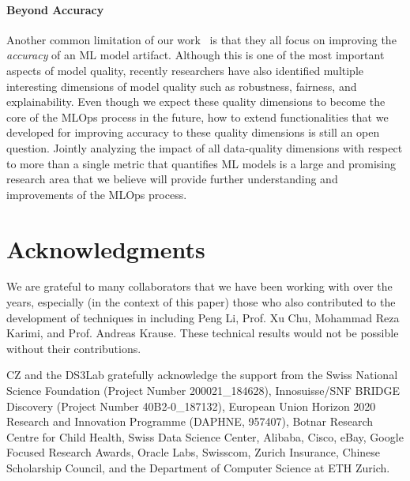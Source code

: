 \documentclass[11pt]{article}
\begin{document}
\paragraph{Beyond Accuracy}
Another common limitation of our work~\cite{karlavs2020nearest, renggli2020automatic, karimi2020online, renggli2019continuous}
is that they all focus on improving the \textit{accuracy} of an ML model artifact. Although this is one of the most important 
aspects of model quality, recently researchers have
also identified multiple interesting dimensions
of model quality such as robustness, fairness,
and explainability. 
Even though we expect these quality dimensions to
become the core of the MLOps process in the future,
how to extend functionalities that we 
developed for improving accuracy to 
these quality dimensions is still an open question.
Jointly analyzing the impact of all data-quality dimensions with respect to more than a single metric that quantifies ML models is a large and promising research area that we believe will provide further understanding and improvements of the MLOps process.


\section*{Acknowledgments}
\small
We are grateful to many collaborators that we have 
been working with over the years, especially (in the context of this paper) those
who also contributed to the development of techniques in \cite{karlavs2020nearest, renggli2020automatic, karimi2020online, renggli2019continuous} including Peng Li, Prof. Xu Chu, Mohammad Reza Karimi, and Prof. Andreas Krause. These technical results would not be possible without their contributions.

CZ and the DS3Lab gratefully acknowledge the support from the Swiss National Science Foundation (Project Number 200021\_184628), Innosuisse/SNF BRIDGE Discovery (Project Number 40B2-0\_187132), European Union Horizon 2020 Research and Innovation Programme (DAPHNE, 957407), Botnar Research Centre for Child Health, Swiss Data Science Center, Alibaba, Cisco, eBay, Google Focused Research Awards, Oracle Labs, Swisscom, Zurich Insurance, Chinese Scholarship Council, and the Department of Computer Science at ETH Zurich.
\end{document}
